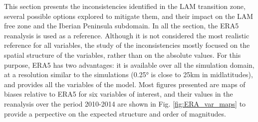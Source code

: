 This section presents the inconsistencies identified in the LAM transition zone, several possible options explored to mitigate them, and their impact on the LAM free zone and the Iberian Peninsula subdomain. In all the section, the ERA5 reanalysis is used as a reference. Although it is not considered the most realistic reference for all variables, the study of the inconsistencies mostly focused on the spatial structure of the variables, rather than on the absolute values.
For this purpose, ERA5 has two advantages: it is available over all the simulation domain, at a resolution similar to the simulations (0.25° is close to 25km in midlatitudes), and provides all the variables of the model.
Most figures presented are maps of biases relative to ERA5 for six variables of interest, and their values in the reanalysis over the period 2010-2014 are shown in Fig. \ref{fig:ERA_var_maps} to provide a perpective on the expected structure and order of magnitudes.

